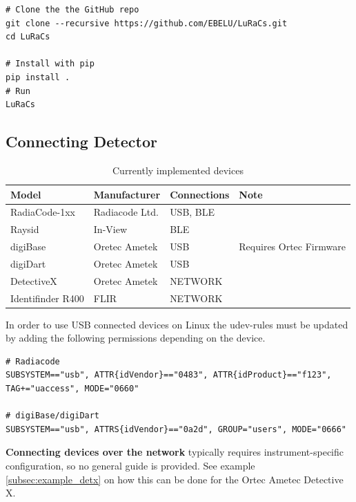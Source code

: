\begin{verbatim}
# Clone the the GitHub repo
git clone --recursive https://github.com/EBELU/LuRaCs.git
cd LuRaCs

# Install with pip
pip install .
# Run
LuRaCs
\end{verbatim}

\subsection{Connecting Detector}\label{sec:connecting_devices}

\begin{table}[H]
\centering
\caption{Currently implemented devices}
\label{tab:implemented_devices}
\begin{tabular}{@{}llll@{}}
\toprule
Model         & Manufacturer  & Connections & Note         \\ \midrule
RadiaCode-1xx & Radiacode Ltd.    & USB, BLE    &              \\
Raysid        & In-View        & BLE         &              \\
digiBase      & Oretec Ametek & USB         &  Requires Ortec Firmware            \\
digiDart      & Oretec Ametek & USB         &              \\
DetectiveX    & Oretec Ametek & NETWORK     &              \\ 
Identifinder R400 & FLIR & NETWORK \\
\bottomrule
\end{tabular}
\end{table}

In order to use USB connected devices on Linux the udev-rules must be updated by adding the following permissions depending on the device.
\begin{verbatim}
# Radiacode
SUBSYSTEM=="usb", ATTR{idVendor}=="0483", ATTR{idProduct}=="f123", TAG+="uaccess", MODE="0660"

# digiBase/digiDart
SUBSYSTEM=="usb", ATTRS{idVendor}=="0a2d", GROUP="users", MODE="0666"

\end{verbatim}

\textbf{Connecting devices over the network } typically requires instrument-specific configuration, so no general guide is provided. See example \ref{subsec:example_detx} on how this can be done for the Ortec Ametec Detective X.


